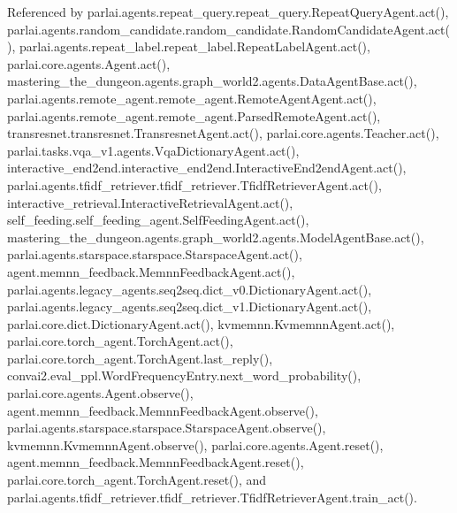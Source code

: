 Referenced by parlai.\+agents.\+repeat\+\_\+query.\+repeat\+\_\+query.\+Repeat\+Query\+Agent.\+act(), parlai.\+agents.\+random\+\_\+candidate.\+random\+\_\+candidate.\+Random\+Candidate\+Agent.\+act(), parlai.\+agents.\+repeat\+\_\+label.\+repeat\+\_\+label.\+Repeat\+Label\+Agent.\+act(), parlai.\+core.\+agents.\+Agent.\+act(), mastering\+\_\+the\+\_\+dungeon.\+agents.\+graph\+\_\+world2.\+agents.\+Data\+Agent\+Base.\+act(), parlai.\+agents.\+remote\+\_\+agent.\+remote\+\_\+agent.\+Remote\+Agent\+Agent.\+act(), parlai.\+agents.\+remote\+\_\+agent.\+remote\+\_\+agent.\+Parsed\+Remote\+Agent.\+act(), transresnet.\+transresnet.\+Transresnet\+Agent.\+act(), parlai.\+core.\+agents.\+Teacher.\+act(), parlai.\+tasks.\+vqa\+\_\+v1.\+agents.\+Vqa\+Dictionary\+Agent.\+act(), interactive\+\_\+end2end.\+interactive\+\_\+end2end.\+Interactive\+End2end\+Agent.\+act(), parlai.\+agents.\+tfidf\+\_\+retriever.\+tfidf\+\_\+retriever.\+Tfidf\+Retriever\+Agent.\+act(), interactive\+\_\+retrieval.\+Interactive\+Retrieval\+Agent.\+act(), self\+\_\+feeding.\+self\+\_\+feeding\+\_\+agent.\+Self\+Feeding\+Agent.\+act(), mastering\+\_\+the\+\_\+dungeon.\+agents.\+graph\+\_\+world2.\+agents.\+Model\+Agent\+Base.\+act(), parlai.\+agents.\+starspace.\+starspace.\+Starspace\+Agent.\+act(), agent.\+memnn\+\_\+feedback.\+Memnn\+Feedback\+Agent.\+act(), parlai.\+agents.\+legacy\+\_\+agents.\+seq2seq.\+dict\+\_\+v0.\+Dictionary\+Agent.\+act(), parlai.\+agents.\+legacy\+\_\+agents.\+seq2seq.\+dict\+\_\+v1.\+Dictionary\+Agent.\+act(), parlai.\+core.\+dict.\+Dictionary\+Agent.\+act(), kvmemnn.\+Kvmemnn\+Agent.\+act(), parlai.\+core.\+torch\+\_\+agent.\+Torch\+Agent.\+act(), parlai.\+core.\+torch\+\_\+agent.\+Torch\+Agent.\+last\+\_\+reply(), convai2.\+eval\+\_\+ppl.\+Word\+Frequency\+Entry.\+next\+\_\+word\+\_\+probability(), parlai.\+core.\+agents.\+Agent.\+observe(), agent.\+memnn\+\_\+feedback.\+Memnn\+Feedback\+Agent.\+observe(), parlai.\+agents.\+starspace.\+starspace.\+Starspace\+Agent.\+observe(), kvmemnn.\+Kvmemnn\+Agent.\+observe(), parlai.\+core.\+agents.\+Agent.\+reset(), agent.\+memnn\+\_\+feedback.\+Memnn\+Feedback\+Agent.\+reset(), parlai.\+core.\+torch\+\_\+agent.\+Torch\+Agent.\+reset(), and parlai.\+agents.\+tfidf\+\_\+retriever.\+tfidf\+\_\+retriever.\+Tfidf\+Retriever\+Agent.\+train\+\_\+act().

\mbox{\label{classparlai_1_1agents_1_1starspace_1_1starspace_1_1StarspaceAgent_aae476e9cdd8b9672ae6c28ef9400f09e}} 
